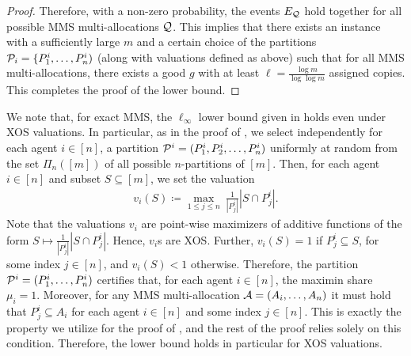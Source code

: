 \begin{proof}
Therefore, with a non-zero probability, the events $E_{\mathcal{Q}}$ hold together for all possible MMS multi-allocations $\mathcal{Q}$. This implies that there exists an instance with a sufficiently large $m$ and a certain choice of the partitions $\mathcal{P}_i=\{P^i_1, \ldots, P^i_n)$ (along with valuations defined as above) such that for all MMS multi-allocations, there exists a good $g$ with at least $\ell = \frac{\log m}{\log \log m}$ assigned copies. This completes the proof of the lower bound. 
\end{proof}

\begin{remark}
We note that, for exact MMS, the $\ell_\infty$ lower bound given in  holds even under XOS valuations. In particular, as in the proof of , we select independently for each agent $i \in [n]$, a partition $\mathcal{P}^i = (P^i_1, P^i_2, \dots, P^i_n)$ uniformly at random from the set $\Pi_n([m])$ of all possible $n$-partitions of $[m]$. Then, for each agent $i \in [n]$ and subset $S \subseteq [m]$, we set the valuation
\begin{align*}
v_i(S) \coloneqq  \max_{1\leq j\leq n} \ \frac{1}{|P^i_j|} |S \cap P^i_j|. 
\end{align*}
Note that the valuations $v_i$ are point-wise maximizers of additive functions of the form $S \mapsto \frac{1}{|P^i_j|} |S \cap P^i_j|$. Hence, $v_i$s are XOS. Further, $v_i(S)=1$ if $P^i_j \subseteq S$, for some index $j \in [n]$, and $v_i(S) < 1$ otherwise. Therefore, the partition $\mathcal{P}^i = (P^i_1, \dots, P^i_n)$ certifies that, for each agent $i \in [n]$, the maximin share $\mu_i = 1$. Moreover, for any MMS multi-allocation $\mathcal{A} = (A_i, \dots, A_n)$ it must hold that $P^i_j \subseteq A_i$ for each agent $i \in [n]$ and some index $j \in [n]$. This is exactly the property we utilize for the proof of , and the rest of the proof relies solely on this condition. Therefore, the lower bound holds in particular for XOS valuations. 
\end{remark}